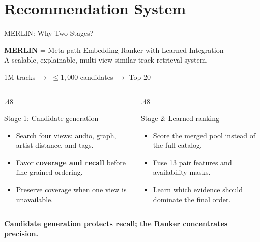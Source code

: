 \documentclass{beamer}
\begin{document}




\section{Recommendation System}

\begin{frame}{MERLIN: Why Two Stages?}

\begin{center}
  \small \textbf{MERLIN} = \alert{Meta-path Embedding Ranker with Learned Integration}\\[-1pt]
  \footnotesize A scalable, explainable, multi-view similar-track retrieval system.
\end{center}

\vspace{-.08cm}
\begin{center}
  \large \alert{1M tracks}
  \quad $\longrightarrow$ \quad
  \alert{$\leq 1{,}000$ candidates}
  \quad $\longrightarrow$ \quad
  \alert{Top-20}
\end{center}

\vspace{-.02cm}
\small
\begin{columns}[T,onlytextwidth]
  \begin{column}{.48\textwidth}
    \begin{block}{Stage 1: Candidate generation}
      \begin{itemize}
        \item Search four views: audio, graph, artist distance, and tags.
        \item Favor \textbf{coverage and recall} before fine-grained ordering.
        \item Preserve coverage when one view is unavailable.
      \end{itemize}
    \end{block}
  \end{column}
  \begin{column}{.48\textwidth}
    \begin{block}{Stage 2: Learned ranking}
      \begin{itemize}
        \item Score the merged pool instead of the full catalog.
        \item Fuse 13 pair features and availability masks.
        \item Learn which evidence should dominate the final order.
      \end{itemize}
    \end{block}
  \end{column}
\end{columns}

\vspace{.24cm}
\begin{center}
  \bfseries Candidate generation protects recall; the Ranker concentrates precision.
\end{center}

\end{frame}
\end{document}
